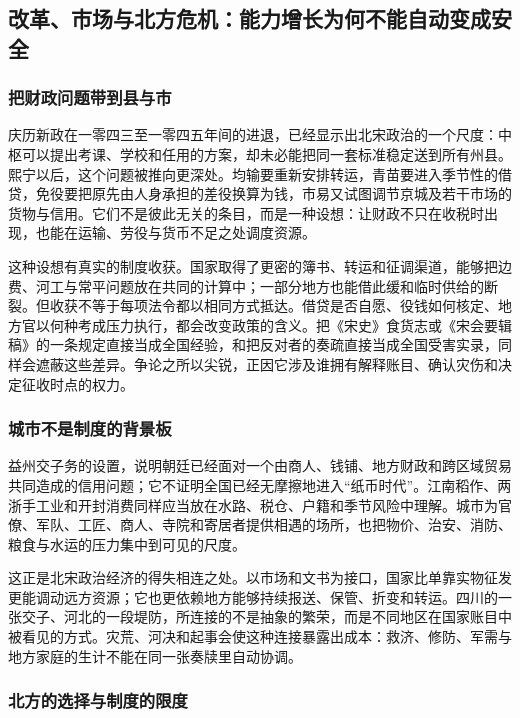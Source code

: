 \subsection{改革、市场与北方危机：能力增长为何不能自动变成安全}

\subsubsection{把财政问题带到县与市}

庆历新政在一零四三至一零四五年间的进退，已经显示出北宋政治的一个尺度：中枢可以提出考课、学校和任用的方案，却未必能把同一套标准稳定送到所有州县。熙宁以后，这个问题被推向更深处。均输要重新安排转运，青苗要进入季节性的借贷，免役要把原先由人身承担的差役换算为钱，市易又试图调节京城及若干市场的货物与信用。它们不是彼此无关的条目，而是一种设想：让财政不只在收税时出现，也能在运输、劳役与货币不足之处调度资源。

这种设想有真实的制度收获。国家取得了更密的簿书、转运和征调渠道，能够把边费、河工与常平问题放在共同的计算中；一部分地方也能借此缓和临时供给的断裂。但收获不等于每项法令都以相同方式抵达。借贷是否自愿、役钱如何核定、地方官以何种考成压力执行，都会改变政策的含义。把《宋史》食货志或《宋会要辑稿》的一条规定直接当成全国经验，和把反对者的奏疏直接当成全国受害实录，同样会遮蔽这些差异。争论之所以尖锐，正因它涉及谁拥有解释账目、确认灾伤和决定征收时点的权力。

\subsubsection{城市不是制度的背景板}

益州交子务的设置，说明朝廷已经面对一个由商人、钱铺、地方财政和跨区域贸易共同造成的信用问题；它不证明全国已经无摩擦地进入“纸币时代”。江南稻作、两浙手工业和开封消费同样应当放在水路、税仓、户籍和季节风险中理解。城市为官僚、军队、工匠、商人、寺院和寄居者提供相遇的场所，也把物价、治安、消防、粮食与水运的压力集中到可见的尺度。

这正是北宋政治经济的得失相连之处。以市场和文书为接口，国家比单靠实物征发更能调动远方资源；它也更依赖地方能够持续报送、保管、折变和转运。四川的一张交子、河北的一段堤防，所连接的不是抽象的繁荣，而是不同地区在国家账目中被看见的方式。灾荒、河决和起事会使这种连接暴露出成本：救济、修防、军需与地方家庭的生计不能在同一张奏牍里自动协调。

\subsubsection{北方的选择与制度的限度}

